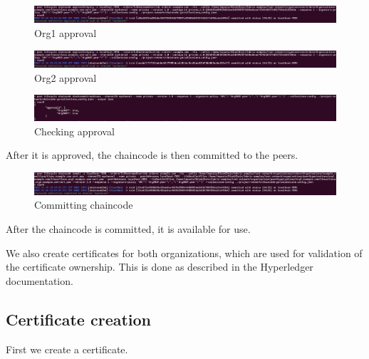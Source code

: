 \documentclass[12pt]{article}
\begin{document}
\begin{figure}[H]
    \centering
    \includegraphics[width=\textwidth]{imgs/org1_approval.PNG}
    \caption{Org1 approval}
    \label{fig:org1approval}
\end{figure}

\begin{figure}[H]
    \centering
    \includegraphics[width=\textwidth]{imgs/org2_approval.PNG}
    \caption{Org2 approval}
    \label{fig:org1approval}
\end{figure}

\begin{figure}[H]
    \centering
    \includegraphics[width=\textwidth]{imgs/checking_approval.PNG}
    \caption{Checking approval}
    \label{fig:checkingapproval}
\end{figure}

After it is approved, the chaincode is then committed to the peers.

\begin{figure}[H]
    \centering
    \includegraphics[width=\textwidth]{imgs/commiting_chaincode.PNG}
    \caption{Committing chaincode}
    \label{fig:commitingchaincode}
\end{figure}

After the chaincode is committed, it is available for use.

We also create certificates for both organizations, which are used for validation of the certificate ownership. This is done as described in the Hyperledger documentation.

\subsection{Certificate creation}

First we create a certificate.
\end{document}
